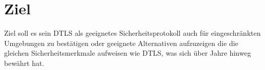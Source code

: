 \section{Ziel}
Ziel soll es sein DTLS als geeignetes Sicherheitsprotokoll auch für eingeschränkten Umgebungen zu bestätigen oder geeignete Alternativen
aufzuzeigen die die gleichen Sicherheitsmerkmale aufweisen wie DTLS, was sich über Jahre hinweg bewährt hat.